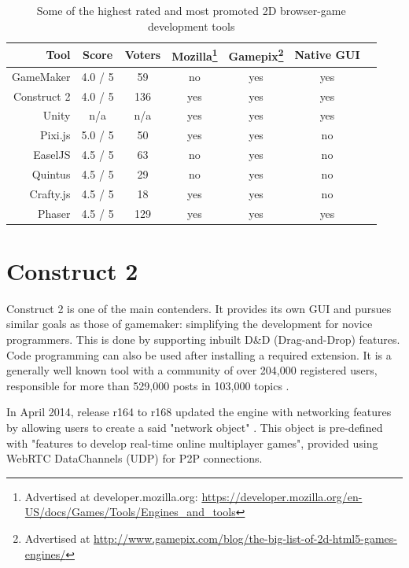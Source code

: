 \documentclass[bsc, 12pt, twoside, singlespacing, parskip, abbrevs, notimes, normalheadings, logo]{styles/infthesis}
\begin{document}
\begin{savenotes}
\begin{table}[H]
\centering
  \begin{tabular}{ | r || c | c | c | c | c | c | }
  	\hline
  	\textbf{Tool}			& \textbf{Score}		& \textbf{Voters}& \textbf{Mozilla}\footnote{Advertised at developer.mozilla.org: \url{https://developer.mozilla.org/en-US/docs/Games/Tools/Engines\_and\_tools}} 	& \textbf{Gamepix}\footnote{Advertised at \url{http://www.gamepix.com/blog/the-big-list-of-2d-html5-games-engines/}} 	& \textbf{Native GUI}\\ \hline\hline
	GameMaker		& 4.0 / 5	& 59	& no	& yes	& yes	\\ \hline
    Construct 2		& 4.0 / 5	& 136	& yes	& yes	& yes	\\ \hline    
    Unity			& n/a		& n/a	& yes	& yes	& yes	\\ \hline
    Pixi.js			& 5.0 / 5	& 50	& yes	& yes	& no	\\ \hline
    EaselJS			& 4.5 / 5	& 63	& no	& yes	& no	\\ \hline
    Quintus			& 4.5 / 5	& 29	& no	& yes	& no	\\ \hline
    Crafty.js		& 4.5 / 5	& 18	& yes	& yes	& no	\\ \hline
    Phaser			& 4.5 / 5	& 129	& yes	& yes	& yes	\\ \hline
  \end{tabular}
  \caption{Some of the highest rated and most promoted 2D browser-game development tools}
  \label{table:Related_Tools}
\end{table}%
\end{savenotes}

\section{Construct 2}
Construct 2 is one of the main contenders. It provides its own GUI and pursues similar goals as those of gamemaker: simplifying the development for novice programmers. This is done by supporting inbuilt D\&D (Drag-and-Drop) features. Code programming can also be used after installing a required extension. It is a generally well known tool with a community of over 204,000 registered users, responsible for more than 529,000 posts in 103,000 topics \cite{scirra_forum}.

In April 2014, release r164 to r168 updated the engine with networking features by allowing users to create a said "network object" \cite{construct2_multiplayer}. This object is pre-defined with "features to develop real-time online multiplayer games", provided using WebRTC DataChannels (UDP) for P2P connections. 
\end{document}
